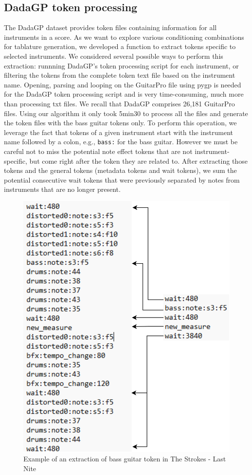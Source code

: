 \subsection{DadaGP token processing}

The DadaGP dataset provides token files containing information for all instruments in a score.
As we want to explore various conditioning combinations for tablature generation, we developed a function to extract tokens specific to selected instruments.
We considered several possible ways to perform this extraction: runnning DadaGP's token processing script for each instrument, or filtering the tokens from the complete token text file based on the instrument name.
Opening, parsing and looping on the GuitarPro file using pygp is needed for the DadaGP token processing script and is very time-consuming, much more than processing txt files.
We recall that DadaGP comprises 26,181 GuitarPro files. Using our algorithm it only took 5min30 to process all the files and generate the token files with the bass guitar tokens only.
To perform this operation, we leverage the fact that tokens of a given instrument start with the instrument name followed by a colon, e.g., \texttt{bass:} for the bass guitar.
However we must be careful not to miss the potential note effect tokens that are not instrument-specific, but come right after the token they are related to.
After extracting those tokens and the general tokens (metadata tokens and wait tokens),
we sum the potential consecutive wait tokens that were previously separated by notes from instruments that are no longer present.

\begin{figure}[!ht]
    \centering
    \includegraphics[width=.5\linewidth]{../images-figures/token_extraction.png}
    \caption{Example of an extraction of bass guitar token in The Strokes - Last Nite}
    \label{fig:token_extraction}
\end{figure}

